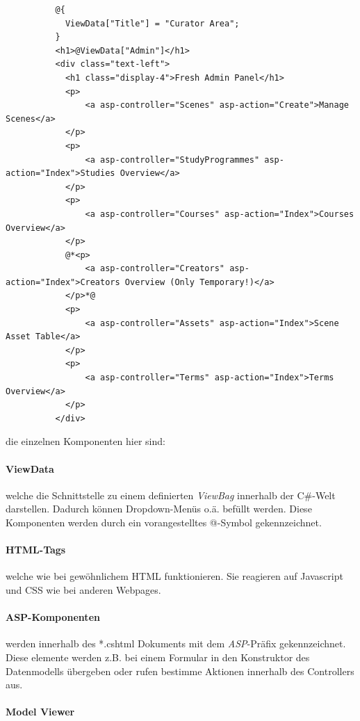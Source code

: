 \documentclass[titlepage, a4paper, 11pt]{scrartcl}
\begin{document}
        \begin{lstlisting}          
          @{
            ViewData["Title"] = "Curator Area";
          }
          <h1>@ViewData["Admin"]</h1>
          <div class="text-left">
            <h1 class="display-4">Fresh Admin Panel</h1>
            <p>
                <a asp-controller="Scenes" asp-action="Create">Manage Scenes</a>
            </p>
            <p>
                <a asp-controller="StudyProgrammes" asp-action="Index">Studies Overview</a>
            </p>
            <p>
                <a asp-controller="Courses" asp-action="Index">Courses Overview</a>
            </p>
            @*<p>
                <a asp-controller="Creators" asp-action="Index">Creators Overview (Only Temporary!)</a>
            </p>*@
            <p>
                <a asp-controller="Assets" asp-action="Index">Scene Asset Table</a>
            </p>
            <p>
                <a asp-controller="Terms" asp-action="Index">Terms Overview</a>
            </p>
          </div>
        \end{lstlisting}
        
        die einzelnen Komponenten hier sind:

        \paragraph{ViewData} welche die Schnittstelle zu einem definierten \textit{ViewBag} innerhalb der C\#-Welt darstellen. Dadurch können Dropdown-Menüs o.ä. befüllt werden.
        Diese Komponenten werden durch ein vorangestelltes @-Symbol gekennzeichnet.

        \paragraph{HTML-Tags} welche wie bei gewöhnlichem HTML funktionieren. Sie reagieren auf Javascript und CSS wie bei anderen Webpages.

        \paragraph{ASP-Komponenten} werden innerhalb des *.cshtml Dokuments mit dem \textit{ASP}-Präfix gekennzeichnet. Diese elemente werden z.B. bei einem Formular in den Konstruktor
        des Datenmodells übergeben oder rufen bestimme Aktionen innerhalb des Controllers aus.
        
        \paragraph{Model Viewer}
\end{document}
